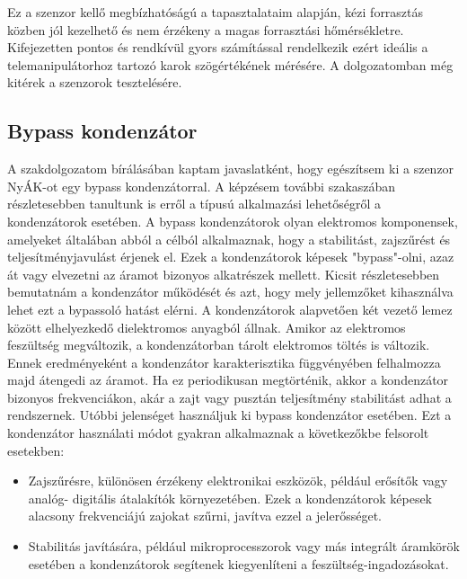Ez a szenzor kellő megbízhatóságú a tapasztalataim alapján, kézi forrasztás közben jól kezelhető és nem érzékeny a magas forrasztási hőmérsékletre. Kifejezetten pontos és rendkívül gyors számítással rendelkezik ezért ideális a telemanipulátorhoz tartozó karok szögértékének mérésére. A dolgozatomban még kitérek a szenzorok tesztelésére.\cite{tlesensor}

\subsection{Bypass kondenzátor}

A szakdolgozatom bírálásában kaptam javaslatként, hogy egészítsem ki a szenzor NyÁK-ot egy bypass kondenzátorral. A képzésem további szakaszában részletesebben tanultunk is erről a típusú alkalmazási lehetőségről a kondenzátorok esetében. A bypass kondenzátorok olyan elektromos komponensek, amelyeket általában abból a célból alkalmaznak, hogy a stabilitást, zajszűrést és teljesítményjavulást érjenek el. Ezek a kondenzátorok képesek "bypass"-olni, azaz át vagy elvezetni az áramot bizonyos alkatrészek mellett. Kicsit részletesebben bemutatnám a kondenzátor működését és azt, hogy mely jellemzőket kihasználva lehet ezt a bypassoló hatást elérni. A kondenzátorok alapvetően két vezető lemez között elhelyezkedő dielektromos anyagból állnak. Amikor az elektromos feszültség megváltozik, a kondenzátorban tárolt elektromos töltés is változik. Ennek eredményeként a kondenzátor karakterisztika függvényében felhalmozza majd átengedi az áramot. Ha ez periodikusan megtörténik, akkor a kondenzátor bizonyos frekvenciákon, akár a zajt vagy pusztán teljesítmény stabilitást adhat a rendszernek. Utóbbi jelenséget használjuk ki bypass kondenzátor esetében. Ezt a kondenzátor használati módot gyakran alkalmaznak a következőkbe felsorolt esetekben:\cite{bypasskond}\cite{vezetekellen}

\begin{itemize}
	\item Zajszűrésre, különösen érzékeny elektronikai eszközök, például erősítők vagy analóg- digitális átalakítók környezetében. Ezek a kondenzátorok képesek alacsony frekvenciájú zajokat szűrni, javítva ezzel a jelerősséget.\cite{bypasskond}
	\item Stabilitás javítására, például mikroprocesszorok vagy más integrált áramkörök esetében a kondenzátorok segítenek kiegyenlíteni a feszültség-ingadozásokat.\cite{bypasskond}\cite{vezetekellen}
\end{itemize}


